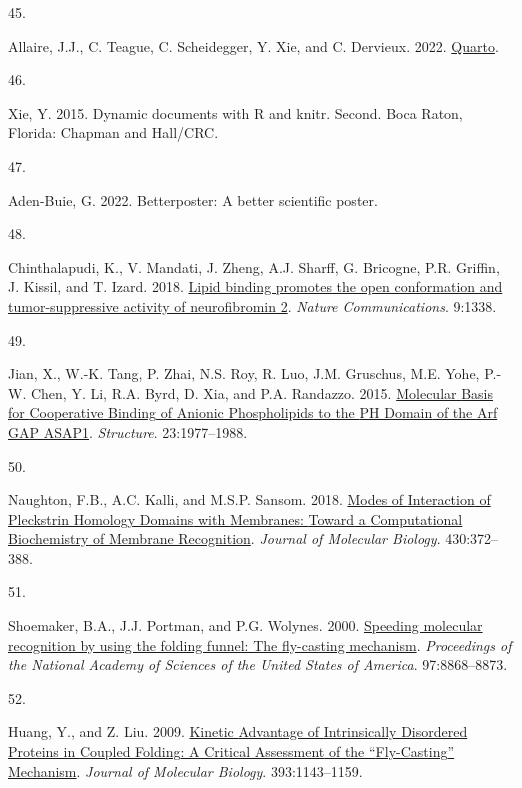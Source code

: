 \documentclass[
  twocolumn]{biophys-new-mod}
\newlength{\cslhangindent}
\newlength{\csllabelwidth}
\newlength{\cslentryspacingunit} %
\newenvironment{CSLReferences}[2] %
 {%
  \setlength{\parindent}{0pt}
  \ifodd #1
  \let\oldpar\par
  \def\par{\hangindent=\cslhangindent\oldpar}
  \fi
  \setlength{\parskip}{#2\cslentryspacingunit}
 }%
 {}
\newcommand{\CSLLeftMargin}[1]{\parbox[t]{\csllabelwidth}{#1}}
\newcommand{\CSLRightInline}[1]{\parbox[t]{\linewidth - \csllabelwidth}{#1}\break}
\begin{document}
\begin{CSLReferences}{0}{0}
\leavevmode{}%
\CSLLeftMargin{45. }%
\CSLRightInline{Allaire, J.J., C. Teague, C. Scheidegger, Y. Xie, and C.
Dervieux. 2022. \href{https://doi.org/10.5281/zenodo.5960048}{Quarto}.}

\leavevmode{}%
\CSLLeftMargin{46. }%
\CSLRightInline{Xie, Y. 2015. Dynamic documents with {R} and knitr.
Second. {Boca Raton, Florida}: {Chapman and Hall/CRC}.}

\leavevmode{}%
\CSLLeftMargin{47. }%
\CSLRightInline{Aden-Buie, G. 2022. Betterposter: {A} better scientific
poster.}

\leavevmode{}%
\CSLLeftMargin{48. }%
\CSLRightInline{Chinthalapudi, K., V. Mandati, J. Zheng, A.J. Sharff, G.
Bricogne, P.R. Griffin, J. Kissil, and T. Izard. 2018.
\href{https://doi.org/10.1038/s41467-018-03648-4}{Lipid binding promotes
the open conformation and tumor-suppressive activity of neurofibromin
2}. \emph{Nature Communications}. 9:1338.}

\leavevmode{}%
\CSLLeftMargin{49. }%
\CSLRightInline{Jian, X., W.-K. Tang, P. Zhai, N.S. Roy, R. Luo, J.M.
Gruschus, M.E. Yohe, P.-W. Chen, Y. Li, R.A. Byrd, D. Xia, and P.A.
Randazzo. 2015.
\href{https://doi.org/10.1016/j.str.2015.08.008}{Molecular {Basis} for
{Cooperative Binding} of {Anionic Phospholipids} to the {PH Domain} of
the {Arf GAP ASAP1}}. \emph{Structure}. 23:1977--1988.}

\leavevmode{}%
\CSLLeftMargin{50. }%
\CSLRightInline{Naughton, F.B., A.C. Kalli, and M.S.P. Sansom. 2018.
\href{https://doi.org/10.1016/j.jmb.2017.12.011}{Modes of {Interaction}
of {Pleckstrin Homology Domains} with {Membranes}: {Toward} a
{Computational Biochemistry} of {Membrane Recognition}}. \emph{Journal
of Molecular Biology}. 430:372--388.}

\leavevmode{}%
\CSLLeftMargin{51. }%
\CSLRightInline{Shoemaker, B.A., J.J. Portman, and P.G. Wolynes. 2000.
\href{https://doi.org/10.1073/pnas.160259697}{Speeding molecular
recognition by using the folding funnel: The fly-casting mechanism}.
\emph{Proceedings of the National Academy of Sciences of the United
States of America}. 97:8868--8873.}

\leavevmode{}%
\CSLLeftMargin{52. }%
\CSLRightInline{Huang, Y., and Z. Liu. 2009.
\href{https://doi.org/10.1016/j.jmb.2009.09.010}{Kinetic {Advantage} of
{Intrinsically Disordered Proteins} in {Coupled
Folding}\textendash{{Binding Process}}: {A Critical Assessment} of the
{``{Fly-Casting}''} {Mechanism}}. \emph{Journal of Molecular Biology}.
393:1143--1159.}


\end{CSLReferences}
\end{document}

